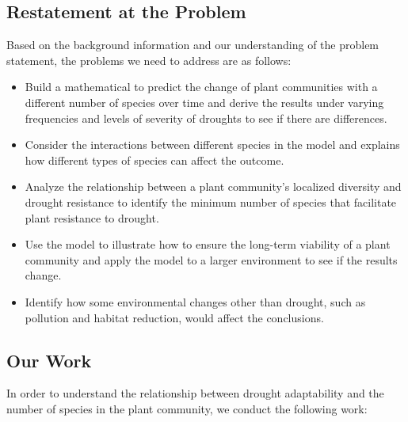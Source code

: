 \documentclass{mcmthesis}
\begin{document}
\subsection{Restatement at the Problem}

\indent

Based on the background information and our understanding of the problem statement, the problems we need to address are as follows:

\begin{itemize}

\item Build a mathematical to predict the change of plant communities with a different number of species over time and derive the results under varying frequencies and levels of severity of droughts to see if there are differences. 

\item Consider the interactions between different species in the model and explains how different types of species can affect the outcome.

\item Analyze the relationship between a plant community's localized diversity and drought resistance to identify the minimum number of species that facilitate plant resistance to drought.

\item Use the model to illustrate how to ensure the long-term viability of a plant community and apply the model to a larger environment to see if the results change.

\item Identify how some environmental changes other than drought, such as pollution and habitat reduction, would affect the conclusions.


\end{itemize}

\subsection{Our Work}

\indent

In order to understand the relationship between drought adaptability and the number of species in the plant community, we conduct the following work:
\end{document}
